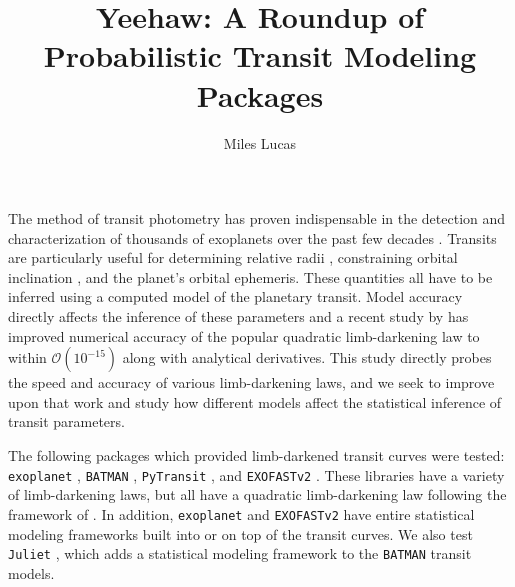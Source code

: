 \documentclass[RNAAS]{aastex631}
\begin{document}
\title{Yeehaw: A Roundup of Probabilistic Transit Modeling Packages}


\author[0000-0001-6341-310X]{Miles Lucas}

\keywords{}

\section{} 

The method of transit photometry has proven indispensable in the detection and characterization of thousands of exoplanets over the past few decades \citep{2007prpl.conf..701C,2009IAUS..253...99W,2010exop.book...55W,2010trex.book.....H}. Transits are particularly useful for determining relative radii \citep{2019A&A...623A.137H}, constraining orbital inclination \citep{2003ApJ...585.1038S}, and the planet's orbital ephemeris. These quantities all have to be inferred using a computed model of the planetary transit. Model accuracy directly affects the inference of these parameters and a recent study by \citet{2020AJ....159..123A} has improved numerical accuracy of the popular quadratic limb-darkening law \citep{2002ApJ...580L.171M} to within $\mathcal{O}(10^{-15})$ along with analytical derivatives. This study directly probes the speed and accuracy of various limb-darkening laws, and we seek to improve upon that work and study how different models affect the statistical inference of transit parameters.

The following packages which provided limb-darkened transit curves were tested: \texttt{exoplanet} \citep{2019ascl.soft10005F}, \texttt{BATMAN} \citep{2015PASP..127.1161K}, \texttt{PyTransit} \citep{Parviainen2015}, and \texttt{EXOFASTv2} \citep{2019arXiv190709480E}. These libraries have a variety of limb-darkening laws, but all have a quadratic limb-darkening law following the framework of \citet{2002ApJ...580L.171M}. In addition, \texttt{exoplanet} and \texttt{EXOFASTv2} have entire statistical modeling frameworks built into or on top of the transit curves. We also test \texttt{Juliet} \citep{2019MNRAS.490.2262E}, which adds a statistical modeling framework to the \texttt{BATMAN} transit models.
\end{document}
